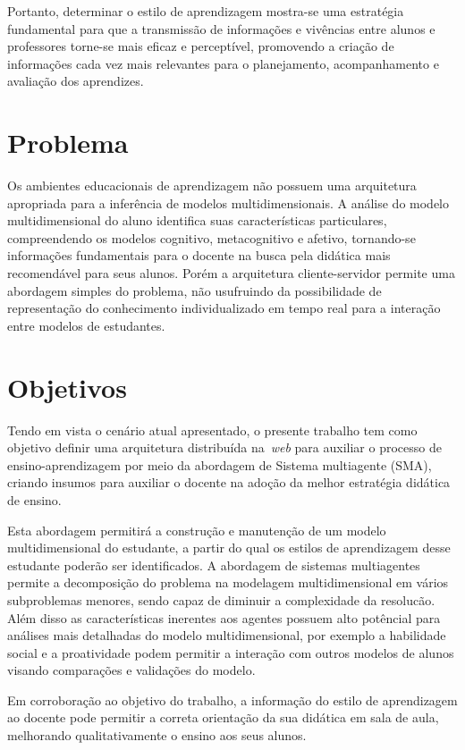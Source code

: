 Portanto, determinar o estilo de aprendizagem mostra-se uma estratégia fundamental para que a transmissão de informações e vivências entre alunos e professores torne-se mais eficaz e perceptível, promovendo a criação de informações cada vez mais relevantes para o planejamento, acompanhamento e avaliação dos aprendizes.

\section{Problema}
Os ambientes educacionais de aprendizagem não possuem uma arquitetura apropriada para a inferência de modelos multidimensionais. A análise do modelo multidimensional do aluno identifica suas características particulares, compreendendo os modelos cognitivo, metacognitivo e afetivo, tornando-se informações fundamentais para o docente na busca pela didática mais recomendável para seus alunos. Porém a arquitetura cliente-servidor permite uma abordagem simples do problema, não usufruindo da possibilidade de representação do conhecimento individualizado em tempo real para a interação entre modelos de estudantes.

\section{Objetivos}
Tendo em vista o cenário atual apresentado, o presente trabalho tem como objetivo definir uma arquitetura distribuída na~\emph{web} para auxiliar o processo de ensino-aprendizagem por meio da abordagem de Sistema multiagente (SMA), criando insumos para auxiliar o docente na adoção da melhor estratégia didática de ensino.

Esta abordagem permitirá a construção e manutenção de um modelo multidimensional do estudante, a partir do qual os estilos de aprendizagem desse estudante poderão ser identificados. A abordagem de sistemas multiagentes permite a decomposição do problema na modelagem multidimensional em vários subproblemas menores, sendo capaz de diminuir a complexidade da resolucão. Além disso as características inerentes aos agentes possuem alto potêncial para análises mais detalhadas do modelo multidimensional, por exemplo a habilidade social e a proatividade podem permitir a interação com outros modelos de alunos visando comparações e validações do modelo.

Em corroboração ao objetivo do trabalho, a informação do estilo de aprendizagem ao docente pode permitir a correta orientação da sua didática em sala de aula, melhorando qualitativamente o ensino aos seus alunos.

